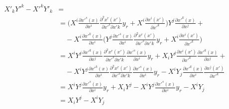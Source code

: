 \begin{equation*}
\begin{split}
X'_k Y'^k - X'^k Y'_k &= \\
&= \bigg( X^i \frac{\partial x'^s(x)}{\partial x^i}\frac{\partial^2 x^r(x')}{\partial x'^s \partial x'k}y_r + X^i \frac{\partial x^i(x')}{\partial x'^k} \bigg) Y^j\frac{\partial x'^k(x)}{\partial x^j} + \\ 
&\quad - X^i\frac{\partial x'^k(x)}{\partial x^i} \bigg(Y^j \frac{\partial x'^s(x)}{\partial x^i}\frac{\partial^2 x^r(x')}{\partial x'^s \partial x'k}y_r + X^i \frac{\partial x^i(x')}{\partial x'^k} \bigg) \\
&= X^i Y^j \frac{\partial x'^k(x)}{\partial x^j}\frac{\partial^2 x^r(x')}{\partial x'^s \partial x'k}\frac{\partial x'^s(x)}{\partial x^i}y_r + X_i Y^j \frac{\partial x^i(x')}{\partial x'^k}\frac{\partial x'^k(x)}{\partial x^j} + \\ 
&\quad - X^iY^j \frac{\partial x'^k(x)}{\partial x^i}\frac{\partial^2 x^r(x')}{\partial x'^s \partial x'k}\frac{\partial x'^s(x)}{\partial x^i}y_r - X^i Y_j \frac{\partial x'^k(x)}{\partial x^i}\frac{\partial x^j(x')}{\partial x'^k} \\
&= X^i Y^j \frac{\partial x'^s(x)}{\partial x^i}y_r + X_i Y^j - X^i Y^j \frac{\partial x'^s(x)}{\partial x^i}y_r - X^i Y_j \\
&= X_i Y^j - X^i Y_j
\end{split}
\end{equation*}
